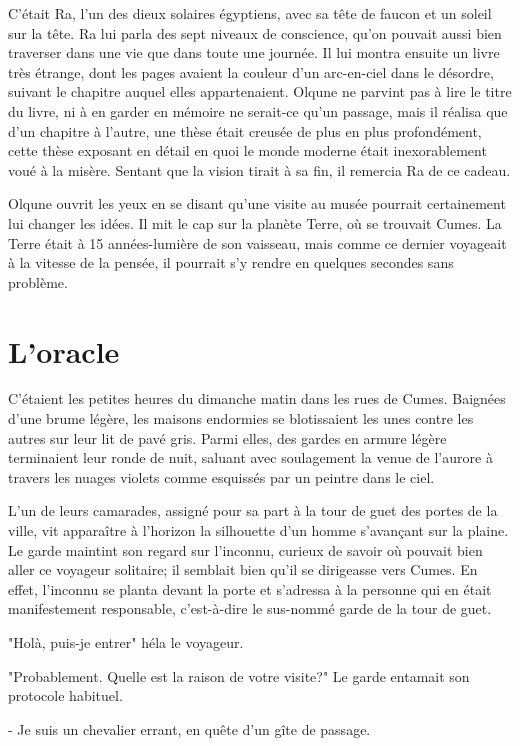 \documentclass[a4paper,11pt, openany]{book}
\begin{document}
C'était Ra, l'un des dieux solaires égyptiens, avec sa tête de faucon et un soleil sur la tête. Ra lui parla des sept niveaux de conscience, qu'on pouvait aussi bien traverser dans une vie que dans toute une journée.
Il lui montra ensuite un livre très étrange, dont les pages avaient la couleur d'un arc-en-ciel dans le désordre, suivant le chapitre auquel elles appartenaient. Olqune ne parvint pas à lire le titre du livre, ni à en garder en mémoire ne serait-ce qu'un passage,
mais il réalisa que d'un chapitre à l'autre, une thèse était creusée de plus en plus profondément, cette thèse exposant en détail en quoi le monde moderne était inexorablement voué à la misère. 
Sentant que la vision tirait à sa fin, il remercia Ra de ce cadeau.

Olqune ouvrit les yeux en se disant qu'une visite au musée pourrait certainement lui changer les idées. Il mit le cap sur la planète Terre, où se trouvait Cumes. La Terre était à 15 années-lumière de son vaisseau, mais comme 
ce dernier voyageait à la vitesse de la pensée, il pourrait s'y rendre en quelques secondes sans problème. 

\chapter{L'oracle}

C'étaient les petites heures du dimanche matin dans les rues de Cumes. Baignées d'une brume légère, les maisons endormies se blotissaient les unes contre les autres sur leur lit de pavé gris.
Parmi elles, des gardes en armure légère terminaient leur ronde de nuit, saluant avec soulagement la venue de l'aurore à travers les nuages violets comme esquissés par un peintre dans le ciel.   

L'un de leurs camarades, assigné pour sa part à la tour de guet des portes de la ville, vit apparaître à l'horizon la silhouette d'un homme s'avançant sur la plaine.
Le garde maintint son regard sur l'inconnu, curieux de savoir où pouvait bien aller ce voyageur solitaire; il semblait bien qu'il se dirigeasse vers Cumes. 
En effet, l'inconnu se planta devant la porte et s'adressa à la personne qui en était manifestement responsable, c'est-à-dire le sus-nommé garde de la tour de guet.


"Holà, puis-je entrer" héla le voyageur.

"Probablement. Quelle est la raison de votre visite?" Le garde entamait son protocole habituel.

- Je suis un chevalier errant, en quête d'un gîte de passage.
\end{document}
